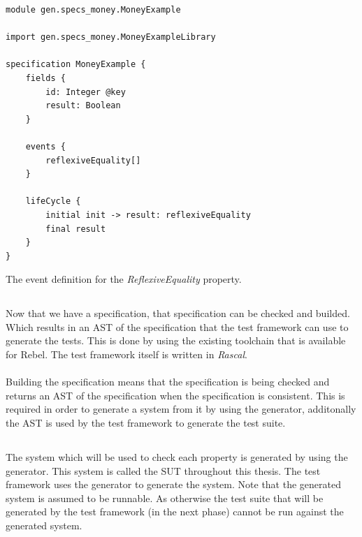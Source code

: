 \FloatBarrier
\begin{sourcecode}[!ht]
\begin{lstlisting}[language=Rebel]
module gen.specs_money.MoneyExample

import gen.specs_money.MoneyExampleLibrary

specification MoneyExample {
	fields {
        id: Integer @key
		result: Boolean
	}

	events {
		reflexiveEquality[]
	}

	lifeCycle {
		initial init -> result:	reflexiveEquality
		final result
	}
}
\end{lstlisting}
\caption{The event definition for the \textit{ReflexiveEquality} property.}
\label{lst:ch3_rebel_specification_oneprop}
\end{sourcecode}
\FloatBarrier

\subsection{\tfPhaseTwo{}}
Now that we have a specification, that specification can be checked and builded. Which results in an AST of the specification that the test framework can use to generate the tests. This is done by using the existing toolchain that is available for Rebel. The test framework itself is written in \textit{Rascal}.\\
\\
Building the specification means that the specification is being checked and returns an AST of the specification when the specification is consistent. This is required in order to generate a system from it by using the generator, additonally the AST is used by the test framework to generate the test suite.

\subsection{\tfPhaseThree{}}
The system which will be used to check each property is generated by using the generator. This system is called the SUT throughout this thesis. The test framework uses the generator to generate the system. Note that the generated system is assumed to be runnable. As otherwise the test suite that will be generated by the test framework (in the next phase) cannot be run against the generated system.

